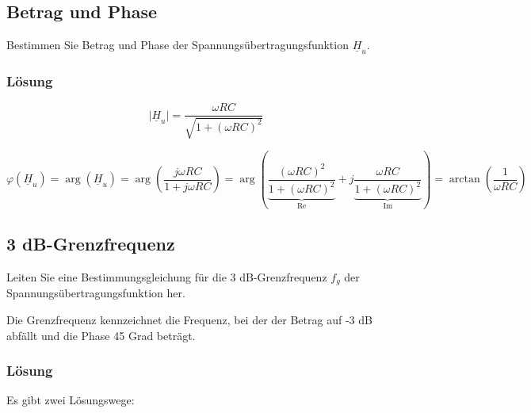 \documentclass[
  ngerman,
  letterpaper,
]{scrbook}
\begin{document}
\subsection{Betrag und Phase}\label{betrag-und-phase-2}

Bestimmen Sie Betrag und Phase der Spannungsübertragungsfunktion
\(\underline{H}_u\).

\subsubsection{Lösung}\label{luxf6sung-23}

\[
\vert\underline{H}_u\vert =\frac{\omega R C}{\sqrt{1 + (\omega R C)^2}} 
\]

\[
\varphi(\underline{H}_u) = \arg(\underline{H}_u)
= \arg \left(\frac{j \omega R C}{1+j\omega R C}\right) 
= \arg \left(
\underbrace{\frac{(\omega R C)^2}{1+(\omega R C)^2}}_{\operatorname{Re}} 
+ j \underbrace{\frac{\omega R C}{1 + (\omega R C)^2}}_{\operatorname{Im}}
\right)
= \arctan\left(\frac{1}{\omega R C}\right)
\]

\subsection{3 dB-Grenzfrequenz}\label{db-grenzfrequenz}

Leiten Sie eine Bestimmungsgleichung für die 3 dB-Grenzfrequenz \(f_g\)
der Spannungsübertragungsfunktion her.

\begin{tcolorbox}[enhanced jigsaw, titlerule=0mm, rightrule=.15mm, toprule=.15mm, colback=white, toptitle=1mm, bottomrule=.15mm, coltitle=black, leftrule=.75mm, arc=.35mm, colbacktitle=quarto-callout-note-color!10!white, opacityback=0, bottomtitle=1mm, colframe=quarto-callout-note-color-frame, opacitybacktitle=0.6, breakable, title=\textcolor{quarto-callout-note-color}{\faInfo}\hspace{0.5em}{Hinweis}, left=2mm]

Die Grenzfrequenz kennzeichnet die Frequenz, bei der der Betrag auf -3
dB abfällt und die Phase 45 Grad beträgt.

\end{tcolorbox}

\subsubsection{Lösung}\label{luxf6sung-24}

Es gibt zwei Lösungswege:
\end{document}
